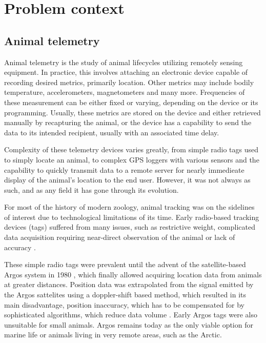 
\chapter{Problem context}

\section{Animal telemetry}

Animal telemetry is the study of animal lifecycles utilizing remotely sensing equipment. In practice, this involves attaching an electronic device capable of recording desired metrics, primarily location. Other metrics may include bodily temperature, accelerometers, magnetometers and many more. Frequencies of these measurement can be either fixed or varying, depending on the device or its programming. Usually, these metrics are stored on the device and either retrieved manually by recapturing the animal, or the device has a capability to send the data to its intended recipient, usually with an associated time delay.

Complexity of these telemetry devices varies greatly, from simple radio tags used to simply locate an animal, to complex GPS loggers with various sensors and the capability to quickly transmit data to a remote server for nearly immedieate display of the animal's location to the end user. However, it was not always as such, and as any field it has gone through its evolution.

For most of the history of modern zoology, animal tracking was on the sidelines of interest due to technological limitations of its time. Early radio-based tracking devices (tags) suffered from many issues, such as restrictive weight, complicated data acquisition requiring near-direct observation of the animal or lack of accuracy \cite{kays2015terrestrial}.

These simple radio tags were prevalent until the advent of the satellite-based Argos system in 1980 \cite{douglas2012moderating}, which finally allowed acquiring location data from animals at greater distances. Position data was extrapolated from the signal emitted by the Argos sattelites using a doppler-shift based method, which resulted in its main disadvantage, position inaccuracy, which has to be compensated for by sophisticated algorithms, which reduce data volume \cite{douglas2012moderating}. Early Argos tags were also unsuitable for small animals. Argos remains today as the only viable option for marine life or animals living in very remote areas, such as the Arctic.

